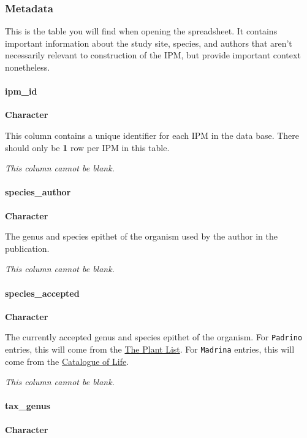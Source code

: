 \documentclass[]{article}
\let\oldparagraph\paragraph
\renewcommand{\paragraph}[1]{\oldparagraph{#1}\mbox{}}
\begin{document}
\subsubsection{Metadata}\label{metadata}

This is the table you will find when opening the spreadsheet. It
contains important information about the study site, species, and
authors that aren't necessarily relevant to construction of the IPM, but
provide important context nonetheless.

\paragraph{ipm\_id}\label{ipm_id}

\textbf{Character}

This column contains a unique identifier for each IPM in the data base.
There should only be \textbf{1} row per IPM in this table.

\emph{This column cannot be blank.}

\paragraph{species\_author}\label{species_author}

\textbf{Character}

The genus and species epithet of the organism used by the author in the
publication.

\emph{This column cannot be blank.}

\paragraph{species\_accepted}\label{species_accepted}

\textbf{Character}

The currently accepted genus and species epithet of the organism. For
\texttt{Padrino} entries, this will come from the
\href{http://www.theplantlist.org/}{The Plant List}. For
\texttt{Madrina} entries, this will come from the
\href{http://www.catalogueoflife.org/}{Catalogue of Life}.

\emph{This column cannot be blank.}

\paragraph{tax\_genus}\label{tax_genus}

\textbf{Character}
\end{document}
